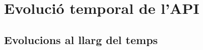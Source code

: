 \section{Evolució temporal de l'API}

    \subsection{Evolucions al llarg del temps}

    \paragraph{}
    

